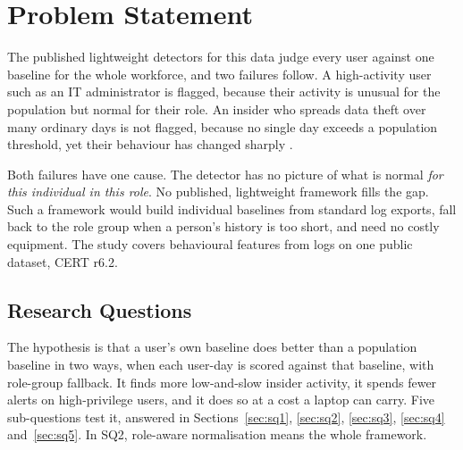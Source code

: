 \documentclass[a4paper,12pt]{article}
\begin{document}
\section{Problem Statement}
\label{sec:problem_statement}

The published lightweight detectors for this data \cite{Noever2019,Le2018} judge every user against one baseline for the whole workforce, and two failures follow. A high-activity user such as an IT administrator is flagged, because their activity is unusual for the population but normal for their role. An insider who spreads data theft over many ordinary days is not flagged, because no single day exceeds a population threshold, yet their behaviour has changed sharply \cite{Cappelli2012}.

Both failures have one cause. The detector has no picture of what is normal \emph{for this individual in this role}. No published, lightweight framework fills the gap. Such a framework would build individual baselines from standard log exports, fall back to the role group when a person's history is too short, and need no costly equipment. The study covers behavioural features from logs on one public dataset, CERT r6.2.

\subsection{Research Questions}
\label{sec:questions}
The hypothesis is that a user's own baseline does better than a population baseline in two ways, when each user-day is scored against that baseline, with role-group fallback. It finds more low-and-slow insider activity, it spends fewer alerts on high-privilege users, and it does so at a cost a laptop can carry. Five sub-questions test it, answered in Sections~\ref{sec:sq1}, \ref{sec:sq2}, \ref{sec:sq3}, \ref{sec:sq4} and~\ref{sec:sq5}. In SQ2, role-aware normalisation means the whole framework.
\end{document}
